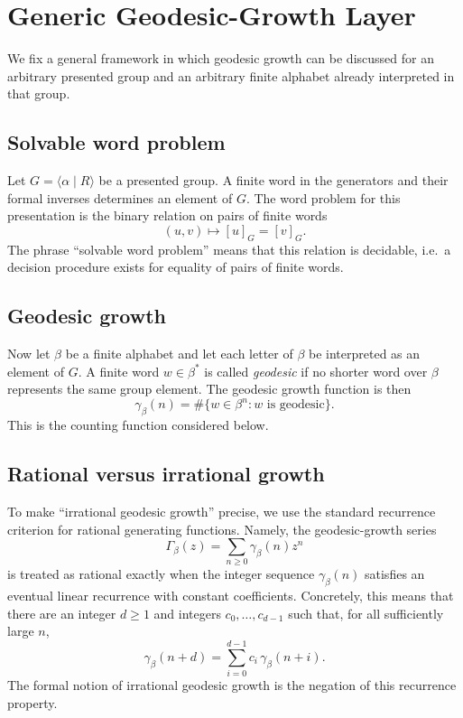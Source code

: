 \section{Generic Geodesic-Growth Layer}
\label{sec:GeodesicGrowth}

We fix a general framework in which geodesic growth can be discussed for an arbitrary presented
group and an arbitrary finite alphabet already interpreted in that group.

\subsection*{Solvable word problem}
Let $G=\langle \alpha \mid R\rangle$ be a presented group. A finite word in the generators and
their formal inverses determines an element of $G$. The word problem for this presentation is the
binary relation on pairs of finite words
\[
(u,v)\longmapsto [u]_G=[v]_G.
\]
The phrase ``solvable word problem'' means that this relation is decidable, i.e.\ a
decision procedure exists for equality of pairs of finite words.

\subsection*{Geodesic growth}
Now let $\beta$ be a finite alphabet and let each letter of $\beta$ be interpreted as an element
of $G$. A finite word $w\in \beta^\ast$ is called \emph{geodesic} if no shorter word over
$\beta$ represents the same group element. The geodesic growth function is then
\[
\gamma_\beta(n)=\#\{w\in \beta^n : w \text{ is geodesic}\}.
\]
This is the counting function considered below.

\subsection*{Rational versus irrational growth}
To make ``irrational geodesic growth'' precise, we use the standard recurrence criterion for
rational generating functions. Namely, the geodesic-growth series
\[
\Gamma_\beta(z)=\sum_{n\ge 0}\gamma_\beta(n)z^n
\]
is treated as rational exactly when the integer sequence $\gamma_\beta(n)$ satisfies an eventual
linear recurrence with constant coefficients. Concretely, this means that there are an integer
$d\ge 1$ and integers $c_0,\dots,c_{d-1}$ such that, for all sufficiently large $n$,
\[
\gamma_\beta(n+d)=\sum_{i=0}^{d-1} c_i\,\gamma_\beta(n+i).
\]
The formal notion of irrational geodesic growth is the negation of this recurrence property.

